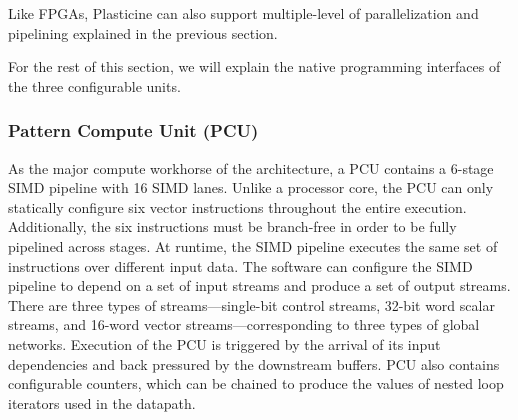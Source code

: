 Like FPGAs, Plasticine can also support multiple-level of parallelization and pipelining explained
in the previous section.

For the rest of this section, we will explain the native programming interfaces of the three
configurable units.

\subsubsection{Pattern Compute Unit (PCU)}
As the major compute workhorse of the architecture, a PCU contains a 6-stage SIMD pipeline with 16 SIMD lanes. 
Unlike a processor core, the PCU can only statically configure six vector instructions throughout the
entire execution.
Additionally, the six instructions must be branch-free in order to be fully pipelined across stages.
At runtime, the SIMD pipeline executes the same set of instructions over different input data.
The software can configure the SIMD pipeline to depend on a set of input streams and
produce a set of output streams. 
There are three types of streams---single-bit control streams, 32-bit word scalar streams, and
16-word vector streams---corresponding to three types of global networks.
Execution of the PCU is triggered by the arrival of its input dependencies and back pressured by
the downstream buffers.
PCU also contains configurable counters, which can be chained to produce the values of nested
loop iterators used in the datapath. 

